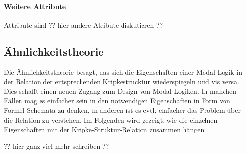 \paragraph{Weitere Attribute} %
\label{par:weitere_attribute} Attribute sind ?? hier andere Atribute diskutieren ??


\subsection{Ähnlichkeitstheorie} %
\label{sub:Aehnlichkeitstheorie}
Die Ähnlichkeitstheorie besagt, das sich die Eigenschaften einer Modal-Logik in der Relation der entsprechenden Kripkestrucktur wiederspiegeln und vis versa. Dies schafft einen neuen Zugang zum Design von Modal-Logiken. In manchen Fällen mag es einfacher sein in den notwendigen Eigenschaften in Form von Formel-Schemata zu denken, in anderen ist es evtl. einfacher das Problem über die Relation zu verstehen. 
Im Folgenden wird gezeigt, wie die einzelnen Eigenschaften mit der Kripke-Struktur-Relation zusammen hängen.

?? hier ganz viel mehr schreiben ??


